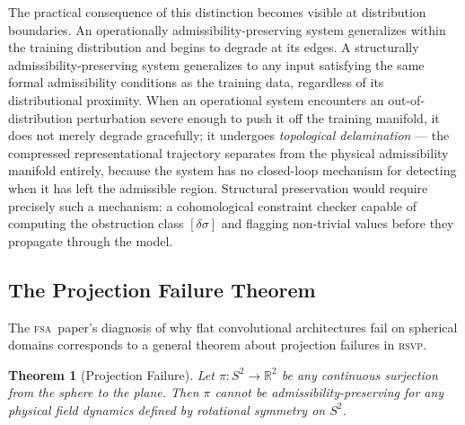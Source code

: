 \documentclass[11pt,a4paper]{article}
\theoremstyle{plain}
\newtheorem{theorem}{Theorem}[section]
\theoremstyle{definition}
\theoremstyle{remark}
\newcommand{\RSVP}{\textup{\textsc{rsvp}}}
\newcommand{\FSA}{\textup{\textsc{fsa}}}
\begin{document}
The practical consequence of this distinction becomes visible at distribution
boundaries. An operationally admissibility-preserving system generalizes
within the training distribution and begins to degrade at its edges.
A structurally admissibility-preserving system generalizes to any input
satisfying the same formal admissibility conditions as the training data,
regardless of its distributional proximity. When an operational system
encounters an out-of-distribution perturbation severe enough to push it
off the training manifold, it does not merely degrade gracefully; it
undergoes \textit{topological delamination} --- the compressed
representational trajectory separates from the physical admissibility
manifold entirely, because the system has no closed-loop mechanism for
detecting when it has left the admissible region. Structural preservation
would require precisely such a mechanism: a cohomological constraint
checker capable of computing the obstruction class $[\delta\sigma]$ and
flagging non-trivial values before they propagate through the model.

\subsection{The Projection Failure Theorem}

The \FSA\ paper's diagnosis of why flat convolutional architectures fail
on spherical domains corresponds to a general theorem about projection
failures in \RSVP.

\begin{theorem}[Projection Failure]
Let $\pi: S^2 \to \mathbb{R}^2$ be any continuous surjection from the
sphere to the plane. Then $\pi$ cannot be admissibility-preserving for
any physical field dynamics defined by rotational symmetry on $S^2$.
\end{theorem}
\end{document}

